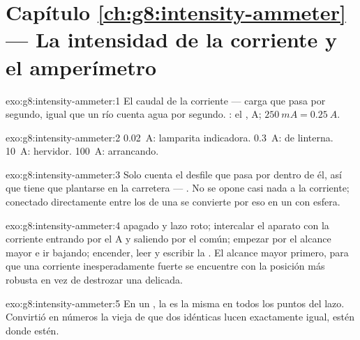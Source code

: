 \section*{Capítulo \ref{ch:g8:intensity-ammeter} --- La intensidad de la corriente y el amperímetro}

\begin{solution}{exo:g8:intensity-ammeter:1}
El caudal de la corriente --- carga que pasa por segundo, igual que un
río cuenta agua por segundo. : el , \unit{A};
$\qty{250}{mA} = \qty{0.25}{A}$.
\end{solution}

\begin{solution}{exo:g8:intensity-ammeter:2}
\qty{0.02}{A}: lamparita indicadora. \qty{0.3}{A}:  de
linterna. \qty{10}{A}: hervidor. \qty{100}{A}:  arrancando.
\end{solution}

\begin{solution}{exo:g8:intensity-ammeter:3}
Solo cuenta el desfile que pasa por dentro de él, así que tiene que
plantarse en la carretera --- . No se opone casi nada a la
corriente; conectado directamente entre los  de una
 se convierte por eso en un  con esfera.
\end{solution}

\begin{solution}{exo:g8:intensity-ammeter:4}
 apagado y lazo roto; intercalar el aparato con la
corriente entrando por el  \unit{A} y saliendo por el común;
empezar por el alcance mayor e ir bajando; encender, leer y escribir
la . El alcance mayor primero, para que una corriente
inesperadamente fuerte se encuentre con la posición más robusta en vez
de destrozar una delicada.
\end{solution}

\begin{solution}{exo:g8:intensity-ammeter:5}
En un , la  es la misma en todos
los puntos del lazo. Convirtió en números la vieja  de que
dos  idénticas  lucen exactamente igual, estén
donde estén.
\end{solution}

